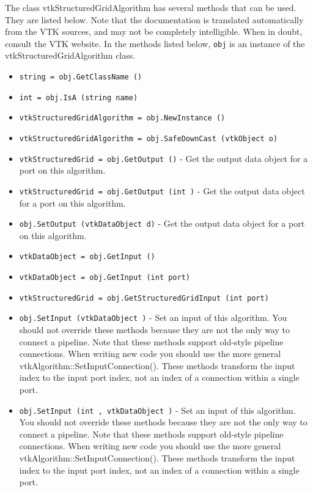 The class vtkStructuredGridAlgorithm has several methods that can be used.
  They are listed below.
Note that the documentation is translated automatically from the VTK sources,
and may not be completely intelligible.  When in doubt, consult the VTK website.
In the methods listed below, \verb|obj| is an instance of the vtkStructuredGridAlgorithm class.
\begin{itemize}
\item  \verb|string = obj.GetClassName ()|

\item  \verb|int = obj.IsA (string name)|

\item  \verb|vtkStructuredGridAlgorithm = obj.NewInstance ()|

\item  \verb|vtkStructuredGridAlgorithm = obj.SafeDownCast (vtkObject o)|

\item  \verb|vtkStructuredGrid = obj.GetOutput ()| -  Get the output data object for a port on this algorithm.

\item  \verb|vtkStructuredGrid = obj.GetOutput (int )| -  Get the output data object for a port on this algorithm.

\item  \verb|obj.SetOutput (vtkDataObject d)| -  Get the output data object for a port on this algorithm.

\item  \verb|vtkDataObject = obj.GetInput ()|

\item  \verb|vtkDataObject = obj.GetInput (int port)|

\item  \verb|vtkStructuredGrid = obj.GetStructuredGridInput (int port)|

\item  \verb|obj.SetInput (vtkDataObject )| -  Set an input of this algorithm. You should not override these
 methods because they are not the only way to connect a pipeline.
 Note that these methods support old-style pipeline connections.
 When writing new code you should use the more general
 vtkAlgorithm::SetInputConnection().  These methods transform the
 input index to the input port index, not an index of a connection
 within a single port.

\item  \verb|obj.SetInput (int , vtkDataObject )| -  Set an input of this algorithm. You should not override these
 methods because they are not the only way to connect a pipeline.
 Note that these methods support old-style pipeline connections.
 When writing new code you should use the more general
 vtkAlgorithm::SetInputConnection().  These methods transform the
 input index to the input port index, not an index of a connection
 within a single port.


\end{itemize}
